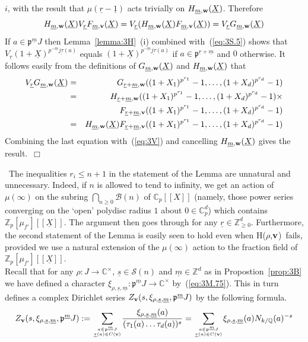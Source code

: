 \documentclass[12pt]{article}
\newcounter{rem}[section]%
\newcommand{\bbC}{\ensuremath{\mathbb{C}}}
\newcommand{\bbQ}{\ensuremath{\mathbb{Q}}}
\newcommand{\bbZ}{\ensuremath{\mathbb{Z}}}
\newcommand{\beql}[1]{\begin{equation}\label{#1}}
\newcommand{\bv}{\ensuremath{{\bf v}}}
\newcommand{\bw}{\ensuremath{{\bf w}}}
\newcommand{\cB}{\ensuremath{\mathcal{B}}}
\newcommand{\cS}{\ensuremath{\mathcal{S}}}
\newcommand{\eeq}{\end{equation}}
\newcommand{\ePf}{\hspace*{\fill}~$\Box$\vertsp\par}%
\newcommand{\fp}{\ensuremath{\mathfrak{p}}}
\newcommand{\refeq}[1]{~(\ref{eq:#1})}
\newcommand{\rem}{\refstepcounter{rem}\noindent{\sc Remark \therem}}%
\renewcommand{\therem}{\thesection.\arabic{rem}}
\newcommand{\vertsp}{\vspace{1ex}}
\newcommand{\Hrhov}{H($\rho$,$\bv$)}
\newcommand{\ujct}{\ensuremath{\underline{j\tau}}}
\newcommand{\um}{\ensuremath{{\underline{m}}}}
\newcommand{\uo}{\ensuremath{{\underline{1}}}}
\newcommand{\ur}{\ensuremath{{\underline{r}}}}
\newcommand{\us}{\ensuremath{{\underline{s}}}}
\newcommand{\utau}{\ensuremath{{\underline{\tau}}}}
\newcommand{\uX}{\ensuremath{{\underline{X}}}}
\begin{document}
$i$, with the result that $\mu(\ur-\uo)$ acts trivially on $H_{\um,\bw}(\uX)$.
Therefore
\beql{eq:3V} H_{\um,\bw}(\uX)V_\ur
F_{\um,\bv}(\uX)=V_\ur(H_{\um,\bw}(\uX)F_{\um,\bv}(\uX))= V_\ur
G_{\um,\bw}(\uX) \eeq
If $a\in\fp^{\um}J$ then
Lemma~\ref{lemma:3H}~(i) combined with\refeq{3S.5} shows that
$V_\ur (1+\uX)^{p^{-\um}\ujct(a)}$ equals
$(1+\uX)^{p^{-\um}\ujct(a)}$ if $a\in\fp^{\ur+\um}$ and $0$ otherwise. It
follows easily from the definitions of $G_{\um,\bw}(\uX)$ and
$H_{\um,\bw}(\uX)$ that
\begin{eqnarray}
V_\ur G_{\um,\bw}(\uX)&=&G_{\ur+\um,\bw}
                             ((1+X_1)^{p^{r_1}}-1,\ldots,(1+X_d)^{p^{r_d}}-1)\nonumber\\
          &=&H_{\ur+\um,\bw}((1+X_1)^{p^{r_1}}-1,\ldots,(1+X_d)^{p^{r_d}}-1)\times\nonumber\\
          &&\ \ \ F_{\ur+\um,\bv}((1+X_1)^{p^{r_1}}-1,\ldots,(1+X_d)^{p^{r_d}}-1)\nonumber\\
          &=&H_{\um,\bw}(\uX)
                F_{\ur+\um,\bv}((1+X_1)^{p^{r_1}}-1,\ldots,(1+X_d)^{p^{r_d}}-1)\nonumber
\end{eqnarray}
Combining the last equation with\refeq{3V} and cancelling
$H_{\um,\bw}(\uX)$ gives the result.\ePf
\rem\ The inequalities $r_i\leq n+1$ in the statement of the Lemma
are unnatural and unnecessary. Indeed, if $n$ is
allowed to tend to infinity, we get an action of $\mu(\infty)$ on the subring
$\bigcap_{n\geq 0}\cB(n)$ of $\bbC_p[[X]]$ (namely, those
power series converging on the `open' polydisc radius $1$ about $0\in\bbC_p^d$) which contains
$\bbZ_p[\mu_{f'}][[\uX]]$. The argument then goes through for any $\ur\in\bbZ_{\geq 0}^d$.
Furthermore, the second statement of the Lemma is easily seen to hold even
when \Hrhov\ fails, provided we use a natural extension
of the $\mu(\infty)$ action to the fraction
field of $\bbZ_p[\mu_{f'}][[\uX]]$.\vspace{1ex}\\
Recall that for any
$\rho:J\rightarrow \bbC^\times$, $\us\in\cS(n)$ and $\um\in\bbZ^d$
as in Propostion~\ref{prop:3B} we have defined a character
$\xi_{\rho,\us,\um}:\fp^\um J\rightarrow\bbC^\times$ by\refeq{3M.75}.
This in turn defines a complex Dirichlet series $Z_{\bv}(s,\xi_{\rho,\us,\um},\fp^\um J)$
by the following formula.
\[
Z_{\bv}(s,\xi_{\rho,\us,\um},\fp^\um J):=
{\displaystyle \sum_{a\in \fp^\um J\atop \utau(a)\in C(\bv)}}
\frac{\xi_{\rho,\us,\um}(a)}{(\tau_1(a)\ldots\tau_d(a))^s}=
{\displaystyle \sum_{a\in \fp^\um J\atop \utau(a)\in C(\bv)}}
\xi_{\rho,\us,\um}(a) N_{k/\bbQ}(a)^{-s}
\]
\end{document}
